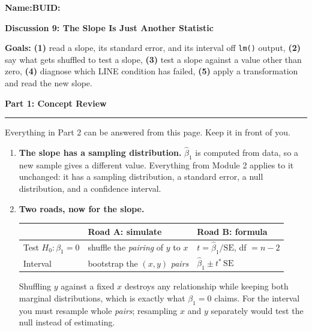 \documentclass[11pt]{article}
\newcommand{\blankline}[1]{\underline{\hspace{#1}}}
\newcommand{\parttitle}[1]{%
  \par\medskip\noindent
  {\large\bfseries #1}\par
  \vspace{-.5em}\noindent\rule{\linewidth}{0.4pt}\par\smallskip}
\begin{document}
\noindent\textbf{Name:}\blankline{2.3in}\hfill\textbf{BUID:}\blankline{1.6in}

\begin{center}
  {\Large\bfseries Discussion 9: The Slope Is Just Another Statistic}
\end{center}

\noindent\textbf{Goals:} \textbf{(1)} read a slope, its standard error, and its interval off
\texttt{lm()} output, \textbf{(2)} say what gets shuffled to test a slope, \textbf{(3)} test a slope
against a value other than zero, \textbf{(4)} diagnose which LINE condition has failed,
\textbf{(5)} apply a transformation and read the new slope.

\parttitle{Part 1: Concept Review}

{\small

\noindent Everything in Part 2 can be answered from this page. Keep it in front of you.

\begin{enumerate}[label=\textbf{\arabic*.}, wide=0pt, itemsep=.4em, topsep=.5em]

\item \textbf{The slope has a sampling distribution.} $\hat\beta_1$ is computed from data, so a new
sample gives a different value. Everything from Module 2 applies to it unchanged: it has a sampling
distribution, a standard error, a null distribution, and a confidence interval.

\item \textbf{Two roads, now for the slope.}

\begin{center}
\renewcommand{\arraystretch}{1.15}
\begin{tabular}{lll}
\toprule
 & \textbf{Road A: simulate} & \textbf{Road B: formula} \\
\midrule
Test $H_0: \beta_1 = 0$ & shuffle the \emph{pairing} of $y$ to $x$ & $t = \hat\beta_1/\text{SE}$, df $= n-2$ \\
Interval & bootstrap the $(x,y)$ \emph{pairs} & $\hat\beta_1 \pm t^{\ast}\,\text{SE}$ \\
\bottomrule
\end{tabular}
\end{center}

Shuffling $y$ against a fixed $x$ destroys any relationship while keeping both marginal
distributions, which is exactly what $\beta_1 = 0$ claims. For the interval you must resample whole
\emph{pairs}; resampling $x$ and $y$ separately would test the null instead of estimating.


\end{enumerate}}
\end{document}
